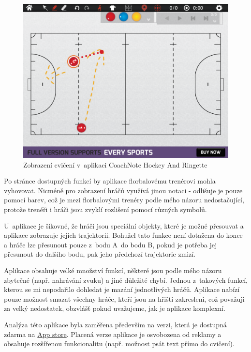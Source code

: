 \documentclass[thesis=B,czech]{FITthesis}[2012/06/26]
\begin{document}
	\begin{figure}[h!t]
		\centering
		\includegraphics[width=\textwidth]{img/competition/coachnote/IMG_0011}
		\caption{Zobrazení cvičení v~aplikaci CoachNote Hockey And Ringette}
		\label{pic:coachnote_exercises}
	\end{figure}

	Po stránce dostupných funkcí by aplikace florbalovému trenérovi mohla vyhovovat. Nicméně pro zobrazení hráčů využívá jinou notaci \-- odlišuje je pouze pomocí barev, což je mezi florbalovými trenéry podle mého názoru nedostačující, protože trenéři i hráči jsou zvyklí rozlišení pomocí různých symbolů.

	U~aplikace je šikovné, že hráči jsou speciální objekty, které je možné přesouvat a aplikace zobrazuje jejich trajektorii. Bohužel tato funkce není dotažena do konce a hráče lze přesunout pouze z~bodu A~do bodu B, pokud je potřeba jej přesunout do dalšího bodu, pak jeho předchozí trajektorie zmizí.

	Aplikace obsahuje velké množství funkcí, některé jsou podle mého názoru zbytečné (např. nahrávání zvuku) a jiné důležité chybí. Jednou z~takových funkcí, kterou se mi nepodařilo dohledat je mazání jednotlivých hráčů. Aplikace nabízí pouze možnost smazat všechny hráče, kteří jsou na hřišti zakresleni, což považuji za velký nedostatek, obzvlášť pokud uvažujeme, jak je aplikace komplexní.

	Analýza této aplikace byla zaměřena především na verzi, která je dostupná zdarma na \href{https://itunes.apple.com/us/app/coachnote-hockey-ringette/id562205341?mt=8}{App store}. Placená verze aplikace je osvobozena od reklamy a obsahuje rozšířenou funkcionalitu (např. možnost psát text přímo do cvičení).
\end{document}
